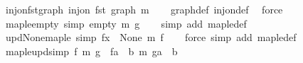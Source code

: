 \begin{isabellebody}
\endisatagproof
{\isafoldproof}%
%
\isadelimproof
\isanewline
%
\endisadelimproof
\isanewline
{}\isamarkupfalse%
\ inj{\isacharunderscore}{\kern0pt}on{\isacharunderscore}{\kern0pt}fst{\isacharunderscore}{\kern0pt}graph{\isacharcolon}{\kern0pt}\ {\isachardoublequoteopen}inj{\isacharunderscore}{\kern0pt}on\ fst\ {\isacharparenleft}{\kern0pt}graph\ m{\isacharparenright}{\kern0pt}{\isachardoublequoteclose}\isanewline
%
\isadelimproof
\ \ %
\endisadelimproof
%
\isatagproof
{}\isamarkupfalse%
\ graph{\isacharunderscore}{\kern0pt}def\ inj{\isacharunderscore}{\kern0pt}on{\isacharunderscore}{\kern0pt}def\ \isamarkupfalse%
\ force%
\endisatagproof
{\isafoldproof}%
%
\isadelimproof
%
\endisadelimproof
%
\isadelimdocument
%
\endisadelimdocument
%
\isatagdocument
%
\isamarkuptrue%
%
\endisatagdocument
{\isafolddocument}%
%
\isadelimdocument
%
\endisadelimdocument
{}\isamarkupfalse%
\ map{\isacharunderscore}{\kern0pt}le{\isacharunderscore}{\kern0pt}empty\ {\isacharbrackleft}{\kern0pt}simp{\isacharbrackright}{\kern0pt}{\isacharcolon}{\kern0pt}\ {\isachardoublequoteopen}empty\ {\isasymsubseteq}\isactrlsub m\ g{\isachardoublequoteclose}\isanewline
%
\isadelimproof
\ \ %
\endisadelimproof
%
\isatagproof
{}\isamarkupfalse%
\ {\isacharparenleft}{\kern0pt}simp\ add{\isacharcolon}{\kern0pt}\ map{\isacharunderscore}{\kern0pt}le{\isacharunderscore}{\kern0pt}def{\isacharparenright}{\kern0pt}%
\endisatagproof
{\isafoldproof}%
%
\isadelimproof
\isanewline
%
\endisadelimproof
\isanewline
{}\isamarkupfalse%
\ upd{\isacharunderscore}{\kern0pt}None{\isacharunderscore}{\kern0pt}map{\isacharunderscore}{\kern0pt}le\ {\isacharbrackleft}{\kern0pt}simp{\isacharbrackright}{\kern0pt}{\isacharcolon}{\kern0pt}\ {\isachardoublequoteopen}f{\isacharparenleft}{\kern0pt}x\ {\isacharcolon}{\kern0pt}{\isacharequal}{\kern0pt}\ None{\isacharparenright}{\kern0pt}\ {\isasymsubseteq}\isactrlsub m\ f{\isachardoublequoteclose}\isanewline
%
\isadelimproof
\ \ %
\endisadelimproof
%
\isatagproof
{}\isamarkupfalse%
\ {\isacharparenleft}{\kern0pt}force\ simp\ add{\isacharcolon}{\kern0pt}\ map{\isacharunderscore}{\kern0pt}le{\isacharunderscore}{\kern0pt}def{\isacharparenright}{\kern0pt}%
\endisatagproof
{\isafoldproof}%
%
\isadelimproof
\isanewline
%
\endisadelimproof
\isanewline
{}\isamarkupfalse%
\ map{\isacharunderscore}{\kern0pt}le{\isacharunderscore}{\kern0pt}upd{\isacharbrackleft}{\kern0pt}simp{\isacharbrackright}{\kern0pt}{\isacharcolon}{\kern0pt}\ {\isachardoublequoteopen}f\ {\isasymsubseteq}\isactrlsub m\ g\ {\isacharequal}{\kern0pt}{\isacharequal}{\kern0pt}{\isachargreater}{\kern0pt}\ f{\isacharparenleft}{\kern0pt}a\ {\isacharcolon}{\kern0pt}{\isacharequal}{\kern0pt}\ b{\isacharparenright}{\kern0pt}\ {\isasymsubseteq}\isactrlsub m\ g{\isacharparenleft}{\kern0pt}a\ {\isacharcolon}{\kern0pt}{\isacharequal}{\kern0pt}\ b{\isacharparenright}{\kern0pt}{\isachardoublequoteclose}\isanewline

\end{isabellebody}
